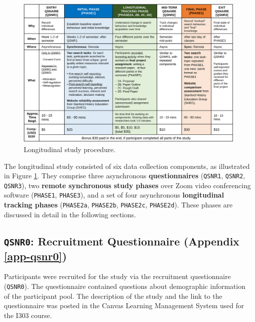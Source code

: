\documentclass[letterpaper, nobind]{templates/ociamthesis}
\begin{document}
\begin{figure}

{\centering \includegraphics[width=1\linewidth]{figs/study-proc} 

}

\caption[Longitudinal study procedure.]{Longitudinal study procedure.}\label{fig:study-proc}
\end{figure}





The longitudinal study consisted of six data collection components, as illustrated in Figure \ref{fig:study-proc}.
They comprise three asynchronous \textbf{questionnaires} (\texttt{QSNR1}, \texttt{QSNR2}, \texttt{QSNR3}),
two \textbf{remote synchronous study phases} over Zoom video conferencing software (\texttt{PHASE1}, \texttt{PHASE3}),
and a set of four asynchronous \textbf{longitudinal tracking phases} (\texttt{PHASE2a}, \texttt{PHASE2b}, \texttt{PHASE2c}, \texttt{PHASE2d}).
These phases are discussed in detail in the following sections.

\hypertarget{sec-method-qsnr0}{%
\subsection{\texorpdfstring{\texttt{QSNR0}: Recruitment Questionnaire (Appendix \ref{app-qsnr0})}{QSNR0: Recruitment Questionnaire (Appendix \ref{app-qsnr0})}}\label{sec-method-qsnr0}}

Participants were recruited for the study via the recruitment questionnaire (\texttt{QSNR0}).
The questionnaire contained questions about demographic information of the participant pool.
The description of the study and the link to the questionnaire was posted in the Canvas Learning Management System used for the I303 course.
\end{document}
